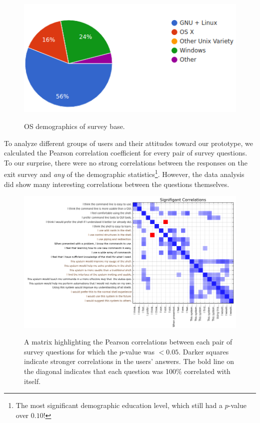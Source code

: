 \begin{figure}[ht]
  \centering
  \includegraphics[width=0.8\linewidth]{figures/stats/os.png}
  \label{fig:OS}
  \caption{OS demographics of survey base. }
\end{figure}



To analyze different groups of users and their attitudes toward our prototype,
we calculated the Pearson correlation coefficient for every pair of survey
questions. To our surprise, there were no strong correlations between the
responses on the exit survey and \emph{any} of the demographic
statistics\footnote{The most significant demographic education level, which
  still had a $p$-value over $0.10$!}.  However, the data analysis did show many
interesting correlations between the questions themselves.

\begin{figure}[H]
  \centering
  \includegraphics[width=\textwidth]{figures/stats/sig.png}
  \label{fig:p_table}
  \caption{A matrix highlighting the Pearson correlations between each pair of
    survey questions for which the $p$-value was $< 0.05$. Darker squares
    indicate stronger correlations in the users' answers. The bold line on the
    diagonal indicates that each question was 100\% correlated with itself.}
\end{figure}

